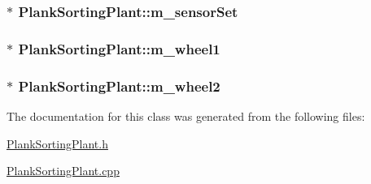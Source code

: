\hypertarget{classPlankSortingPlant_a4946e0e57ac1049bb7602708f884579b}{
\subsubsection[{m\-\_\-sensor\-Set}]{$\ast$ Plank\-Sorting\-Plant\-::m\-\_\-sensor\-Set\hspace{0.3cm}{\ttfamily [private]}}}\label{classPlankSortingPlant_a4946e0e57ac1049bb7602708f884579b}
\hypertarget{classPlankSortingPlant_a755d0e2c79ee575d469f2db9011cf4f1}{
\subsubsection[{m\-\_\-wheel1}]{$\ast$ Plank\-Sorting\-Plant\-::m\-\_\-wheel1\hspace{0.3cm}{\ttfamily [private]}}}\label{classPlankSortingPlant_a755d0e2c79ee575d469f2db9011cf4f1}
\hypertarget{classPlankSortingPlant_a60a0596b799edbeef6d8a61a1e6bd9fc}{
\subsubsection[{m\-\_\-wheel2}]{$\ast$ Plank\-Sorting\-Plant\-::m\-\_\-wheel2\hspace{0.3cm}{\ttfamily [private]}}}\label{classPlankSortingPlant_a60a0596b799edbeef6d8a61a1e6bd9fc}


The documentation for this class was generated from the following files\-:\begin{DoxyCompactItemize}
\item 
\hyperlink{PlankSortingPlant_8h}{Plank\-Sorting\-Plant.\-h}\item 
\hyperlink{PlankSortingPlant_8cpp}{Plank\-Sorting\-Plant.\-cpp}\end{DoxyCompactItemize}
